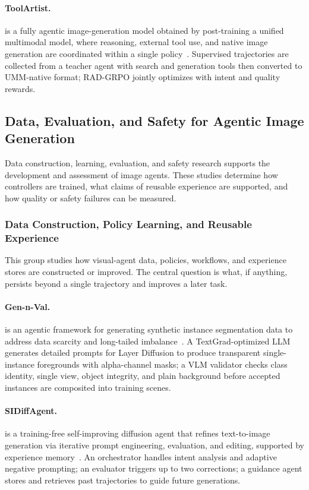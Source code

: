 \paragraph{ToolArtist.}
 is a fully agentic image-generation model obtained by post-training a unified multimodal model, where reasoning, external tool use, and native image generation are coordinated within a single policy~\cite{zhao2026toolartist}. Supervised trajectories are collected from a teacher agent with search and generation tools then converted to UMM-native format; RAD-GRPO jointly optimizes with intent and quality rewards. 

\subsection{Data, Evaluation, and Safety for Agentic Image Generation}
Data construction, learning, evaluation, and safety research supports the development and assessment of image agents. These studies determine how controllers are trained, what claims of reusable experience are supported, and how quality or safety failures can be measured.

\subsubsection{Data Construction, Policy Learning, and Reusable Experience}
This group studies how visual-agent data, policies, workflows, and experience stores are constructed or improved. The central question is what, if anything, persists beyond a single trajectory and improves a later task.

\paragraph{Gen-n-Val.}
 is an agentic framework for generating synthetic instance segmentation data to address data scarcity and long-tailed imbalance~\cite{huang2025gennval}. A TextGrad-optimized LLM generates detailed prompts for Layer Diffusion to produce transparent single-instance foregrounds with alpha-channel masks; a VLM validator checks class identity, single view, object integrity, and plain background before accepted instances are composited into training scenes. 

\paragraph{SIDiffAgent.}
 is a training-free self-improving diffusion agent that refines text-to-image generation via iterative prompt engineering, evaluation, and editing, supported by experience memory~\cite{avg260202051}. An orchestrator handles intent analysis and adaptive negative prompting; an evaluator triggers up to two corrections; a guidance agent stores and retrieves past trajectories to guide future generations.




